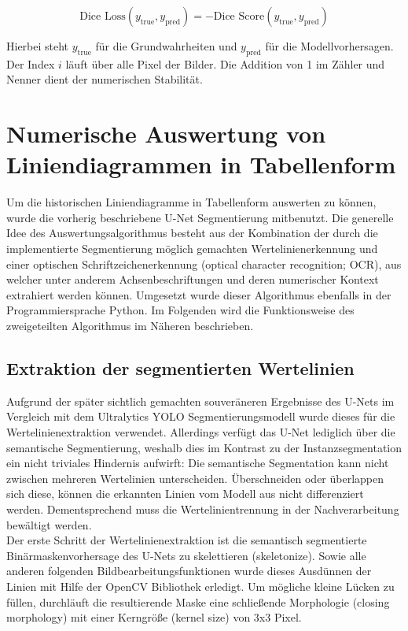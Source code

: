 \begin{equation}
    \text{Dice Loss}(y_{\text{true}}, y_{\text{pred}}) = -\text{Dice Score}(y_{\text{true}}, y_{\text{pred}}) \nonumber
\end{equation}

Hierbei steht $y_{\text{true}}$ für die Grundwahrheiten und $y_{\text{pred}}$ für die Modellvorhersagen. Der Index $i$ läuft über alle Pixel der Bilder. Die Addition von 1 im Zähler und Nenner dient der numerischen Stabilität.


\section{Numerische Auswertung von Liniendiagrammen in Tabellenform}

Um die historischen Liniendiagramme in Tabellenform auswerten zu können, wurde die vorherig beschriebene U-Net Segmentierung mitbenutzt. Die generelle Idee des Auswertungsalgorithmus besteht aus der Kombination der durch die implementierte Segmentierung möglich gemachten Wertelinienerkennung und einer optischen Schriftzeichenerkennung (optical character recognition; OCR), aus welcher unter anderem Achsenbeschriftungen und deren numerischer Kontext extrahiert werden können. Umgesetzt wurde dieser Algorithmus ebenfalls in der Programmiersprache Python. Im Folgenden wird die Funktionsweise des zweigeteilten Algorithmus im Näheren beschrieben.

\subsection{Extraktion der segmentierten Wertelinien}

Aufgrund der später sichtlich gemachten souveräneren Ergebnisse des U-Nets im Vergleich mit dem Ultralytics YOLO Segmentierungsmodell wurde dieses für die Wertelinienextraktion verwendet. Allerdings verfügt das U-Net lediglich über die semantische Segmentierung, weshalb dies im Kontrast zu der Instanzsegmentation ein nicht triviales Hindernis aufwirft: Die semantische Segmentation kann nicht zwischen mehreren Wertelinien unterscheiden. Überschneiden oder überlappen sich diese, können die erkannten Linien vom Modell aus nicht differenziert werden. Dementsprechend muss die Wertelinientrennung in der Nachverarbeitung bewältigt werden.
\\
Der erste Schritt der Wertelinienextraktion ist die semantisch segmentierte Binärmaskenvorhersage des U-Nets zu skelettieren (skeletonize). Sowie alle anderen folgenden Bildbearbeitungsfunktionen wurde dieses Ausdünnen der Linien mit Hilfe der OpenCV Bibliothek erledigt. Um mögliche kleine Lücken zu füllen, durchläuft die resultierende Maske eine schließende Morphologie (closing morphology) mit einer Kerngröße (kernel size) von 3x3 Pixel.

